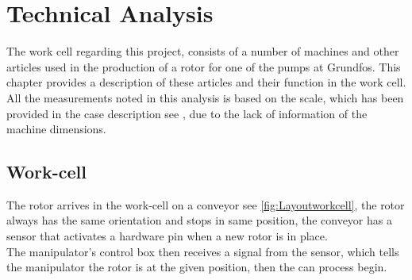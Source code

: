  \chapter{Technical Analysis} \label{TechAnalysis}
 
The work cell regarding this project, consists of a number of machines and other articles used in the production of a rotor for one of the pumps at Grundfos. This chapter provides a description of these articles and their function in the work cell\cite{robotsave}. All the measurements noted in this analysis is based on the scale, which has been provided in the case description see \cite{Case}, due to the lack of information of the machine dimensions. \\ 
 


 \section{Work-cell}
 The rotor arrives in the work-cell on a conveyor see \ref{fig:Layoutworkcell}, the rotor always has the same orientation and stops in same position, the conveyor has a sensor that activates a hardware pin when a new rotor is in place.\\
 The manipulator's control box then receives a signal from the sensor, which tells the manipulator the rotor is at the given position, then the can process begin.\\






